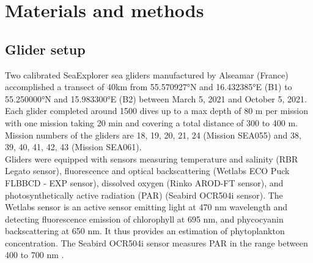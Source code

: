 \documentclass[../Main.tex]{subfiles}
\begin{document}
\section{Materials and methods}
\subsection{Glider setup}
Two calibrated SeaExplorer sea gliders manufactured by Alseamar (France) accomplished a transect of 40km from 55.570927°N and 16.432385°E (B1) to 55.250000°N and 15.983300°E (B2) between March 5, 2021 and October 5, 2021. 
Each glider completed around 1500 dives up to a max depth of 80 m per mission with one mission taking 20 min and covering a total distance of 300 to 400 m. 
Mission numbers of the gliders are 18, 19, 20, 21, 24 (Mission SEA055) and 38, 39, 40, 41, 42, 43 (Mission SEA061). 
\\ 
Gliders were equipped with sensors measuring temperature and salinity (RBR Legato sensor), fluorescence and optical backscattering (Wetlabs ECO Puck FLBBCD - EXP sensor), dissolved oxygen (Rinko AROD-FT sensor), and photosynthetically active radiation (PAR) (Seabird OCR504i sensor). 
The Wetlabs sensor is an active sensor emitting light at 470 nm wavelength and detecting fluorescence emission of chlorophyll at 695 nm, and phycocyanin backscattering at 650 nm. 
It thus provides an estimation of phytoplankton concentration. 
The Seabird OCR504i sensor measures PAR in the range between 400 to 700 nm \cite{Alseamar2020}.
\end{document}
